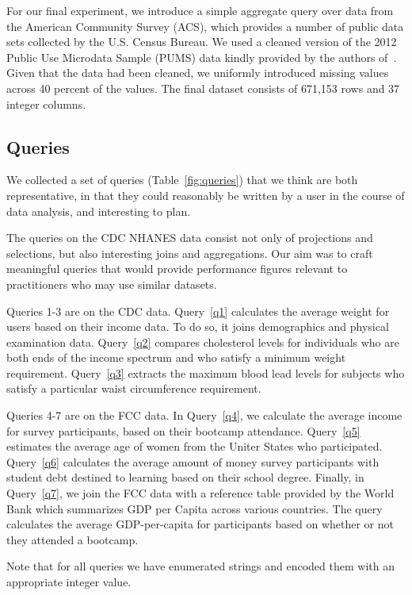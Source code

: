 For our final experiment, we introduce a simple aggregate query over data from the American Community Survey (ACS), which
provides a number of public data sets collected by the U.S. Census Bureau.
We used a cleaned version of the 2012 Public Use Microdata Sample (PUMS) data kindly provided by the authors of~\cite{akande2015empirical}.
Given that the data had been cleaned, we uniformly introduced missing values across 40 percent of the values. The final dataset consists
of 671,153 rows and 37 integer columns.

\subsection{Queries}
We collected a set of queries (Table~\ref{fig:queries}) that we think are both representative, in that they could reasonably be written by a user in the course of data analysis, and interesting to plan.

The queries on the CDC NHANES data consist not only of projections and selections,
but also interesting joins and aggregations. Our aim was to craft meaningful queries
that would provide performance figures relevant to practitioners who may use
similar datasets.

Queries 1-3 are on the CDC data. Query~\ref{q1} calculates the average weight for users based on their income data.
To do so, it joins demographics and physical examination data. Query~\ref{q2}
compares cholesterol levels for individuals who are both ends of the income
spectrum and who satisfy a minimum weight requirement. Query~\ref{q3}
extracts the maximum blood lead levels for subjects who satisfy a particular
waist circumference requirement.

Queries 4-7 are on the FCC data. In Query~\ref{q4}, we calculate the average income for survey participants,
based on their bootcamp attendance. Query~\ref{q5} estimates the average
age of women from the Uniter States who participated. Query~\ref{q6} 
calculates the average amount of money survey participants with student debt destined to
learning based on their school degree. Finally, in Query~\ref{q7}, we join the FCC data with a reference table provided
by the World Bank which summarizes GDP per Capita across various
countries\cite{worldbank-data}. The query calculates the average GDP-per-capita for participants based on whether or not they
attended a bootcamp. 

Note that for all queries we have enumerated strings and encoded them with
an appropriate integer value.

